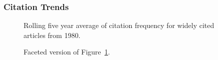 \documentclass[
  10pt,
  letterpaper,
  DIV=11,
  numbers=noendperiod,
  twoside]{scrartcl}
\begin{document}
\subsubsection*{Citation Trends}\label{citation-trends-4}

\begin{figure}


\caption{\label{fig-citation-spaghetti-1980}Rolling five year average of
citation frequency for widely cited articles from 1980.}

\end{figure}%

\begin{figure}


\caption{\label{fig-citation-facet-1980}Faceted version of
Figure~\ref{fig-citation-spaghetti-1980}.}

\end{figure}%
\end{document}
